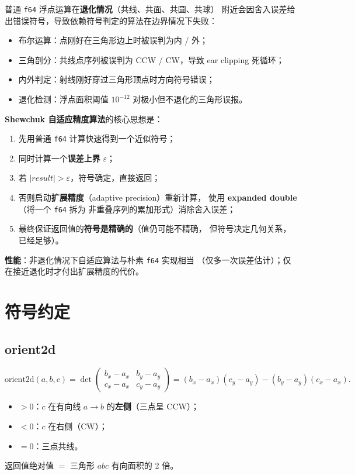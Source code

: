 \documentclass[11pt,a4paper]{article}
\begin{document}
普通 \texttt{f64} 浮点运算在\textbf{退化情况}（共线、共面、共圆、共球）
附近会因舍入误差给出错误符号，导致依赖符号判定的算法在边界情况下失败：

\begin{itemize}
  \item 布尔运算：点刚好在三角形边上时被误判为内 / 外；
  \item 三角剖分：共线点序列被误判为 CCW / CW，导致 ear clipping 死循环；
  \item 内外判定：射线刚好穿过三角形顶点时方向符号错误；
  \item 退化检测：浮点面积阈值 $10^{-12}$ 对极小但不退化的三角形误报。
\end{itemize}

\textbf{Shewchuk 自适应精度算法}的核心思想是：

\begin{enumerate}
  \item 先用普通 \texttt{f64} 计算快速得到一个近似符号；
  \item 同时计算一个\textbf{误差上界} $\varepsilon$；
  \item 若 $|result| > \varepsilon$，符号确定，直接返回；
  \item 否则启动\textbf{扩展精度}（adaptive precision）重新计算，
        使用 \textbf{expanded double}（将一个 \texttt{f64} 拆为
        非重叠序列的累加形式）消除舍入误差；
  \item 最终保证返回值的\textbf{符号是精确的}（值仍可能不精确，
        但符号决定几何关系，已经足够）。
\end{enumerate}

\textbf{性能}：非退化情况下自适应算法与朴素 \texttt{f64} 实现相当
（仅多一次误差估计）；仅在接近退化时才付出扩展精度的代价。

\section{符号约定}

\subsection{orient2d}

\[
  \text{orient2d}(a, b, c) =
  \det\begin{pmatrix}
    b_x - a_x & b_y - a_y \\
    c_x - a_x & c_y - a_y
  \end{pmatrix}
  = (b_x - a_x)(c_y - a_y) - (b_y - a_y)(c_x - a_x).
\]

\begin{itemize}
  \item $> 0$：$c$ 在有向线 $a \to b$ 的\textbf{左侧}（三点呈 CCW）；
  \item $< 0$：$c$ 在右侧（CW）；
  \item $= 0$：三点共线。
\end{itemize}
返回值绝对值 $=$ 三角形 $abc$ 有向面积的 2 倍。
\end{document}
